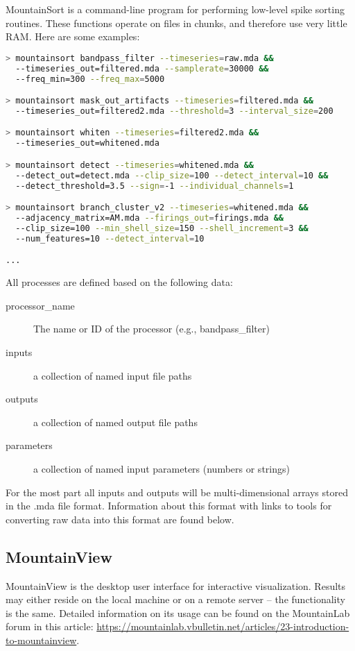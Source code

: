 \documentclass{article}
\begin{document}
MountainSort is a command-line program for performing low-level spike sorting routines. These functions operate on files in chunks, and therefore use very little RAM. Here are some examples:
\begin{lstlisting}[language=bash]
> mountainsort bandpass_filter --timeseries=raw.mda &&
  --timeseries_out=filtered.mda --samplerate=30000 &&
  --freq_min=300 --freq_max=5000

> mountainsort mask_out_artifacts --timeseries=filtered.mda &&
  --timeseries_out=filtered2.mda --threshold=3 --interval_size=200

> mountainsort whiten --timeseries=filtered2.mda &&
  --timeseries_out=whitened.mda

> mountainsort detect --timeseries=whitened.mda &&
  --detect_out=detect.mda --clip_size=100 --detect_interval=10 &&
  --detect_threshold=3.5 --sign=-1 --individual_channels=1

> mountainsort branch_cluster_v2 --timeseries=whitened.mda &&
  --adjacency_matrix=AM.mda --firings_out=firings.mda &&
  --clip_size=100 --min_shell_size=150 --shell_increment=3 &&
  --num_features=10 --detect_interval=10

...
\end{lstlisting}

All processes are defined based on the following data:
\begin{description}
\item[processor\_name] The name or ID of the processor (e.g., bandpass\_filter)
\item[inputs] a collection of named input file paths
\item[outputs] a collection of named output file paths
\item[parameters] a collection of named input parameters (numbers or strings)
\end{description}

For the most part all inputs and outputs will be multi-dimensional arrays stored in the .mda file format. Information about this format with links to tools for converting raw data into this format are found below.

\subsection{MountainView}

MountainView is the desktop user interface for interactive visualization. Results may either reside on the local machine or on a remote server -- the functionality is the same. Detailed information on its usage can be found on the MountainLab forum in this article: \url{https://mountainlab.vbulletin.net/articles/23-introduction-to-mountainview}.
\end{document}
